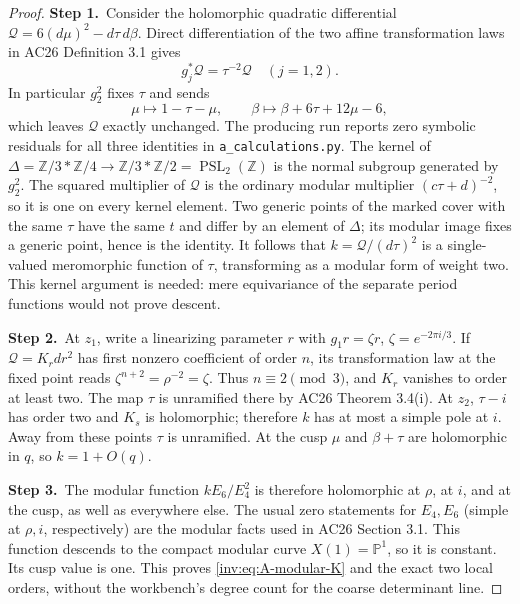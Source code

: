 \documentclass[11pt,a4paper]{article}
\theoremstyle{plain}
\theoremstyle{definition}
\begin{document}
\begin{proof}
\par\smallskip\noindent\textbf{Step 1.}\ Consider the holomorphic quadratic differential
$\mathscr Q=6(d\mu)^2-d\tau\,d\beta$.  Direct differentiation of
the two affine transformation laws in AC26 Definition 3.1 gives
\[
g_j^*\mathscr Q=\tau^{-2}\mathscr Q\quad(j=1,2).
\]
In particular $g_2^2$ fixes $\tau$ and sends
\[
\mu\longmapsto1-\tau-\mu,\qquad
\beta\longmapsto\beta+6\tau+12\mu-6,
\]
which leaves $\mathscr Q$ exactly unchanged.  The producing run reports zero symbolic residuals for all three identities in \texttt{a\_calculations.py}.
The kernel of
$\Delta=\mathbb Z/3*\mathbb Z/4\to\mathbb Z/3*\mathbb Z/2=\operatorname{PSL}_2(\mathbb Z)$
is the normal subgroup generated by $g_2^2$.  The squared multiplier
of $\mathscr Q$ is the ordinary modular multiplier
$(c\tau+d)^{-2}$, so it is one on every kernel element.  Two generic
points of the marked cover with the same $\tau$ have the same $t$
and differ by an element of $\Delta$; its modular image fixes a
generic point, hence is the identity.  It follows that
$k=\mathscr Q/(d\tau)^2$ is a single-valued meromorphic function of
$\tau$, transforming as a modular form of weight two.  This kernel
argument is needed: mere equivariance of the separate period functions
would not prove descent.

\par\smallskip\noindent\textbf{Step 2.}\ At $z_1$, write a linearizing parameter $r$ with
$g_1r=\zeta r$, $\zeta=e^{-2\pi i/3}$.  If $\mathscr Q=K_rdr^2$
has first nonzero coefficient of order $n$, its transformation law
at the fixed point reads $\zeta^{n+2}=\rho^{-2}=\zeta$.
Thus $n\equiv2\pmod3$, and $K_r$ vanishes to order at least two.
The map $\tau$ is unramified there by AC26 Theorem 3.4(i).  At
$z_2$, $\tau-i$ has order two and $K_s$ is holomorphic; therefore
$k$ has at most a simple pole at $i$.  Away from these points
$\tau$ is unramified.  At the cusp $\mu$ and $\beta+\tau$ are
holomorphic in $q$, so $k=1+O(q)$.

\par\smallskip\noindent\textbf{Step 3.}\ The modular function $k E_6/E_4^2$ is therefore holomorphic at
$\rho$, at $i$, and at the cusp, as well as everywhere else.
The usual zero statements for $E_4,E_6$ (simple at $\rho,i$,
respectively) are the modular facts used in AC26 Section 3.1.
This function descends to the compact modular curve $X(1)=\mathbb P^1$,
so it is constant.  Its cusp value is one.  This proves
\eqref{inv:eq:A-modular-K} and the exact two local orders, without the
workbench's degree count for the coarse determinant line.


\end{proof}
\end{document}
